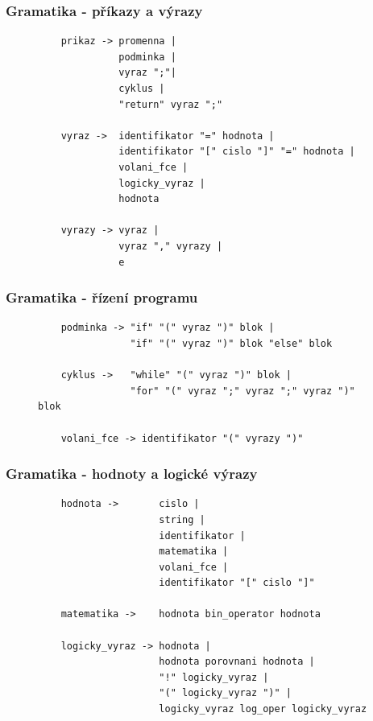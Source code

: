 \documentclass[xcolor=dvipsnames]{beamer}
\begin{document}
\begin{frame}[fragile]
\frametitle{\textbf{Gramatika - příkazy a výrazy}}
    \begin{figure}
        \centering
        \begin{verbatim}
    prikaz -> promenna |
              podminka |
              vyraz ";"|
              cyklus |
              "return" vyraz ";"
              
    vyraz ->  identifikator "=" hodnota |
              identifikator "[" cislo "]" "=" hodnota |
              volani_fce |
              logicky_vyraz |
              hodnota
              
    vyrazy -> vyraz |
              vyraz "," vyrazy |
              e
        \end{verbatim}
    \end{figure}
\end{frame}

\begin{frame}[fragile]
\frametitle{\textbf{Gramatika - řízení programu}}
    \begin{figure}
        \centering
        \begin{verbatim}
    podminka -> "if" "(" vyraz ")" blok |
                "if" "(" vyraz ")" blok "else" blok
    
    cyklus ->   "while" "(" vyraz ")" blok |
                "for" "(" vyraz ";" vyraz ";" vyraz ")" blok
                
    volani_fce -> identifikator "(" vyrazy ")"
        \end{verbatim}
    \end{figure}
\end{frame}

\begin{frame}[fragile]
\frametitle{\textbf{Gramatika - hodnoty a logické výrazy}}
    \begin{figure}
        \centering
        \fontsize{10pt}{12pt}\selectfont
        \begin{verbatim}
    hodnota ->       cislo |
                     string |
                     identifikator |
                     matematika |
                     volani_fce |
                     identifikator "[" cislo "]"

    matematika ->    hodnota bin_operator hodnota

    logicky_vyraz -> hodnota |
                     hodnota porovnani hodnota |
                     "!" logicky_vyraz |
                     "(" logicky_vyraz ")" |
                     logicky_vyraz log_oper logicky_vyraz
        \end{verbatim}
    \end{figure}
\end{frame}
\end{document}
